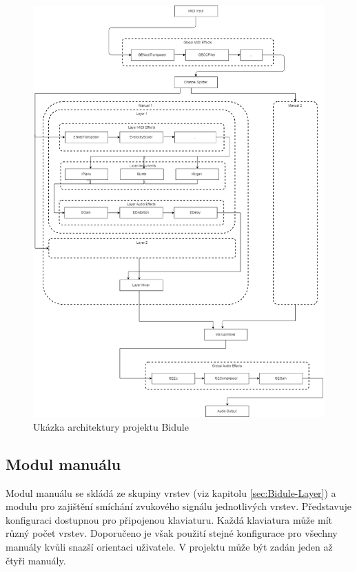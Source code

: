 \documentclass[thesis=M,czech]{FITthesis}[2019/03/06]
\begin{document}
	\begin{figure}
		\centering
		\includegraphics[width=1\textwidth]{BiduleComponents}
		\caption{Ukázka architektury projektu Bidule}\label{fig:BiduleComponents}
	\end{figure}
	
	\subsection{Modul manuálu}\label{sec:Bidule-Manual}
	Modul manuálu se skládá ze skupiny vrstev (viz kapitolu \ref{sec:Bidule-Layer}) a modulu pro zajištění smíchání zvukového signálu
	jednotlivých vrstev. Představuje konfiguraci dostupnou pro připojenou klaviaturu. Každá klaviatura může mít různý počet
	vrstev. Doporučeno je však použití stejné konfigurace pro všechny manuály kvůli snazší orientaci uživatele.
	V projektu může být zadán jeden až čtyři manuály.
	
\end{document}
